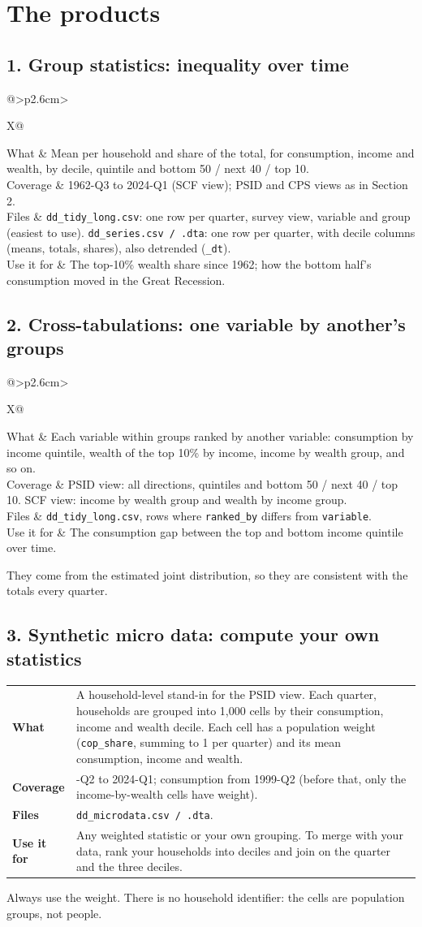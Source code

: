 \documentclass[11pt]{article}
\makeatletter
\newcommand{\file}[1]{\texttt{#1}}
\newenvironment{product}[1]{\subsection*{#1}}{}
\newcommand{\facts}[1]{\begin{tabularx}{\linewidth}{@{}>{\bfseries}p{2.6cm}>{\raggedright\arraybackslash}X@{}}#1\end{tabularx}\par\vspace{3pt}}
\makeatother
\begin{document}
\clearpage
\section{The products}

\begin{product}{1. Group statistics: inequality over time}
\facts{
What & Mean per household and share of the total, for consumption, income and wealth, by decile,
       quintile and bottom 50 / next 40 / top 10. \\
Coverage & 1962-Q3 to 2024-Q1 (SCF view); PSID and CPS views as in Section 2. \\
Files & \file{dd\_tidy\_long.csv}: one row per quarter, survey view, variable and group (easiest to use).\newline
        \file{dd\_series.csv / .dta}: one row per quarter, with decile columns (means, totals, shares),
        also detrended (\file{\_dt}). \\
Use it for & The top-10\% wealth share since 1962; how the bottom half's consumption moved in the
             Great Recession. \\
}
\end{product}

\begin{product}{2. Cross-tabulations: one variable by another's groups}
\facts{
What & Each variable within groups ranked by another variable: consumption by income quintile, wealth
       of the top 10\% by income, income by wealth group, and so on. \\
Coverage & PSID view: all directions, quintiles and bottom 50 / next 40 / top 10. SCF view: income by
           wealth group and wealth by income group. \\
Files & \file{dd\_tidy\_long.csv}, rows where \file{ranked\_by} differs from \file{variable}. \\
Use it for & The consumption gap between the top and bottom income quintile over time. \\
}
They come from the estimated joint distribution, so they are consistent with the totals every quarter.
\end{product}

\begin{product}{3. Synthetic micro data: compute your own statistics}
\facts{
What & A household-level stand-in for the PSID view. Each quarter, households are grouped into 1,000 cells
       by their consumption, income and wealth decile. Each cell has a population weight
       (\file{cop\_share}, summing to 1 per quarter) and its mean consumption, income and wealth. \\
Coverage & 1984-Q2 to 2024-Q1; consumption from 1999-Q2 (before that, only the income-by-wealth cells
           have weight). \\
Files & \file{dd\_microdata.csv / .dta}. \\
Use it for & Any weighted statistic or your own grouping. To merge with your data, rank your households
             into deciles and join on the quarter and the three deciles. \\
}
Always use the weight. There is no household identifier: the cells are population groups, not people.
\end{product}
\end{document}
